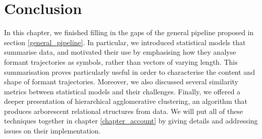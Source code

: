 \documentclass[../main.tex]{subfiles}
\begin{document}
\section{Conclusion}
In this chapter, we finished filling in the gaps of the general pipeline proposed in section \ref{general_pipeline}. In particular, we introduced statistical models that summarise data, and motivated their use by emphasising how they analyse formant trajectories as symbols, rather than vectors of varying length. This summarisation proves particularly useful in order to characterise the content and shape of formant trajectories. Moreover, we also discussed several similarity metrics between statistical models and their challenges. Finally, we offered a deeper presentation of hierarchical agglomerative clustering, an algorithm that produces arborescent relational structures from data. We will put all of these techniques together in chapter \ref{chapter_account} by giving details and addressing issues on their implementation.
\end{document}
